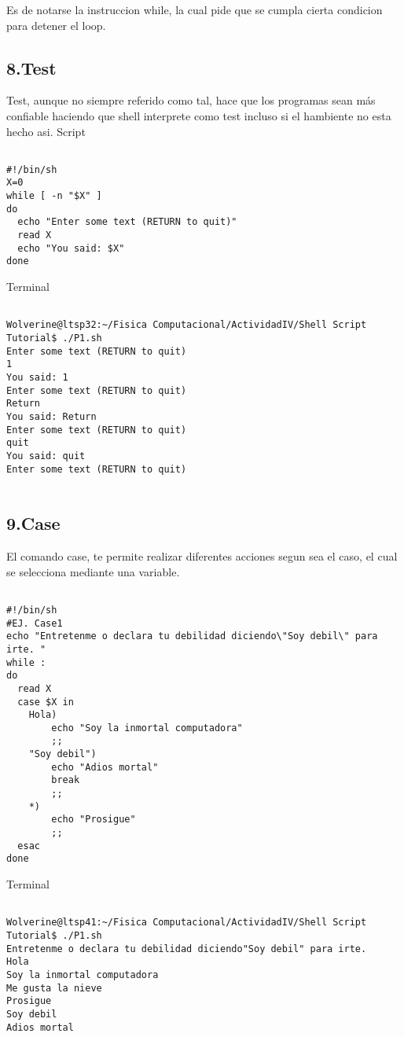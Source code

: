 \documentclass[a4paper]{article}
\begin{document}
Es de notarse la instruccion while, la cual pide que se cumpla cierta condicion para detener el loop.

\subsection{8.Test}

Test, aunque no siempre referido como tal, hace que los programas sean más confiable haciendo que shell interprete como test incluso si el hambiente no esta hecho asi.
\linebreak
Script

\begin{verbatim}

#!/bin/sh
X=0
while [ -n "$X" ]
do
  echo "Enter some text (RETURN to quit)"
  read X
  echo "You said: $X"
done

\end{verbatim}
Terminal
\begin{verbatim}

Wolverine@ltsp32:~/Fisica Computacional/ActividadIV/Shell Script Tutorial$ ./P1.sh
Enter some text (RETURN to quit)
1
You said: 1
Enter some text (RETURN to quit)
Return 
You said: Return
Enter some text (RETURN to quit)
quit      
You said: quit
Enter some text (RETURN to quit)


\end{verbatim}



\subsection{9.Case}

El comando case, te permite realizar diferentes acciones segun sea el caso, el cual se selecciona mediante una variable.



\begin{verbatim}

#!/bin/sh
#EJ. Case1
echo "Entretenme o declara tu debilidad diciendo\"Soy debil\" para irte. "
while :
do
  read X
  case $X in
	Hola)
		echo "Soy la inmortal computadora"
		;;
	"Soy debil")
		echo "Adios mortal"
		break
		;;
	*)
		echo "Prosigue"
		;;
  esac
done

\end{verbatim}
Terminal

\begin{verbatim}

Wolverine@ltsp41:~/Fisica Computacional/ActividadIV/Shell Script Tutorial$ ./P1.sh
Entretenme o declara tu debilidad diciendo"Soy debil" para irte. 
Hola
Soy la inmortal computadora
Me gusta la nieve
Prosigue
Soy debil
Adios mortal

\end{verbatim}
\end{document}
